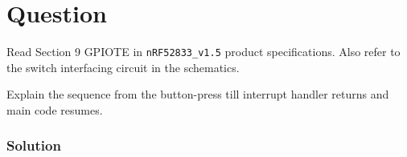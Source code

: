 \section*{Question}

Read Section 9 GPIOTE in \texttt{nRF52833\_v1.5} product specifications.
Also refer to the switch interfacing circuit in the schematics.

Explain the sequence from the button-press till interrupt handler returns and main code resumes.

\subsubsection*{Solution}
